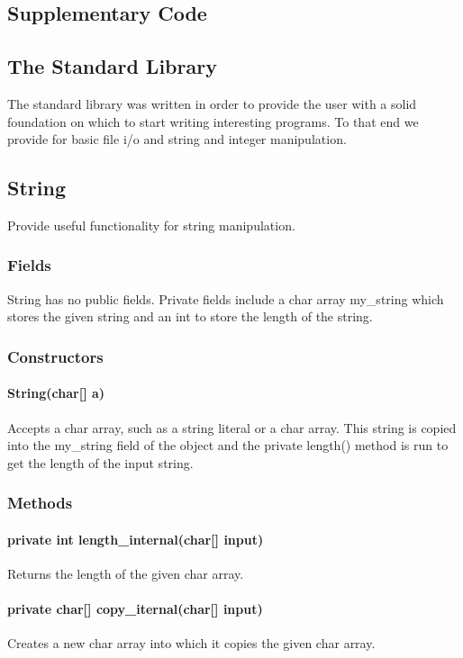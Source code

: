 \begin{homeworkProblem}
	\section{Supplementary Code}
	\subsection{The Standard Library}
	The standard library was written in order to provide the user with a solid foundation on which to start writing interesting programs. To that end we provide for basic file i/o and string and integer manipulation.
	
	\subsection{String}
	Provide useful functionality for string manipulation.
	
	\subsubsection{Fields}
	String has no public fields. Private fields include a char array my\_string which stores the given string and an int to store the length of the string. 
	
	\subsubsection{Constructors}
	\paragraph{String(char[] a)}
	Accepts a char array, such as a string literal or a char array. This string is copied into the my\_string field of the object and the private length() method is run to get the length of the input string.
	
	\subsubsection{Methods}
	\paragraph{private int length\_internal(char[] input)}
	Returns the length of the given char array.
	\paragraph{private char[] copy\_iternal(char[] input)}
	Creates a new char array into which it copies the given char array.

\end{homeworkProblem}
